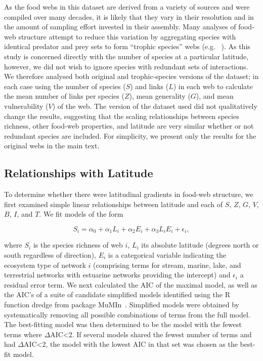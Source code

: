 \documentclass[12pt]{article}
\begin{document}
  As the food webs in this dataset are derived from a variety of sources and were compiled over many decades, it
  is likely that they vary in their resolution and in the amount of sampling effort invested in their assembly.
  Many analyses of food-web structure attempt to reduce this variation by aggregating species with identical predator and prey
  sets to form ``trophic species'' webs (e.g. ~\citep{Martinez1991,Vermaat2009,Dunne2004,Dunne2013}). As this study
  is concerned directly with the number of species at a particular latitude, however, we did not wish to ignore 
  species with redundant sets of interactions. We therefore analysed both original and trophic-species versions
  of the dataset; in each case using the number of species ($S$) and 
  links ($L$) in each web to calculate the mean number of links per species ($Z$), mean generality 
  ($G$), and mean vulnerability ($V$) of the web. 
  The version of the dataset used did not qualitatively change the results, suggesting that
  the scaling relationships between species richness, other food-web properties, and latitude are very 
  similar whether or not redundant species are included. For simplicity, we present only
  the results for the original webs in the main text. 


\subsection*{Relationships with Latitude}

  To determine whether there were latitudinal gradients in food-web structure,
  we first examined simple linear relationships between latitude and each of 
  $S$, $Z$, $G$, $V$, $B$, $I$, and $T$. We fit models of the form

  \begin{equation}
  \label{Latfull}
  S_{i} = \alpha_{0} + \alpha_{1} L_{i} + \alpha_{2} E_{i} + \alpha_{3} L_{i} E_{i} + \epsilon_{i} ,
  \end{equation}

  \noindent where $S_{i}$ is the species richness of web $i$, $L_{i}$ its absolute
  latitude (degrees north or south  regardless of direction), $E_{i}$ is a categorical
  variable indicating the ecosystem type of network $i$ (comprising terms for stream, 
  marine, lake, and terrestrial networks with estuarine
  networks providing the intercept) and $\epsilon_{i}$ a residual error term. 
  We next calculated the AIC
  of the maximal model, as well as the AIC's of a suite of candidate simplified models identified
  using the R~\citep{R} function dredge from package MuMIn~\citep{MuMIn}. 
  Simplified models were obtained by
  systematically removing all possible combinations of terms from the full model.
  The best-fitting model was then determined to be the model with the fewest terms 
  where $\Delta$AIC\textless2. If several models shared the fewest number of terms 
  and had $\Delta$AIC\textless2, the model with the lowest AIC in that set was chosen as the best-fit
  model.
\end{document}
